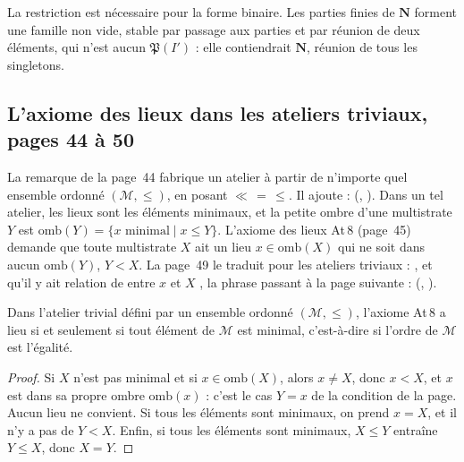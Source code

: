 \noindent La restriction  est nécessaire pour la forme binaire. Les parties finies de $\mathbf N$ forment une famille non vide, stable par passage aux parties et par réunion de deux éléments, qui n'est aucun $\mathfrak P(I')$ : elle contiendrait $\mathbf N$, réunion de tous les singletons.

\subsection*{L'axiome des lieux dans les ateliers triviaux, pages 44 à 50}

La remarque de la page~44 fabrique un atelier à partir de n'importe quel ensemble ordonné $(\mathcal M, \leq)$, en posant $\ll\, = \,\leq$. Il ajoute :  (, ). Dans un tel atelier, les lieux sont les éléments minimaux, et la petite ombre d'une multistrate $Y$ est $\mathrm{omb}(Y) = \{x \text{ minimal} \mid x \leq Y\}$. L'axiome des lieux At\,8 (page~45) demande que toute multistrate $X$ ait un lieu $x \in \mathrm{omb}(X)$ qui ne soit dans aucun $\mathrm{omb}(Y)$, $Y < X$. La page~49 le traduit pour les ateliers triviaux : , et qu'il y ait relation de  entre $x$ et $X$ , la phrase passant à la page suivante :  (, ).

\begin{enonce}
Dans l'atelier trivial défini par un ensemble ordonné $(\mathcal M, \leq)$, l'axiome At\,8 a lieu si et seulement si tout élément de $\mathcal M$ est minimal, c'est-à-dire si l'ordre de $\mathcal M$ est l'égalité.
\end{enonce}

\begin{proof}
Si $X$ n'est pas minimal et si $x \in \mathrm{omb}(X)$, alors $x \neq X$, donc $x < X$, et $x$ est dans sa propre ombre $\mathrm{omb}(x)$ : c'est le cas $Y = x$ de la condition de la page. Aucun lieu ne convient. Si tous les éléments sont minimaux, on prend $x = X$, et il n'y a pas de $Y < X$. Enfin, si tous les éléments sont minimaux, $X \leq Y$ entraîne $Y \leq X$, donc $X = Y$.
\end{proof}

